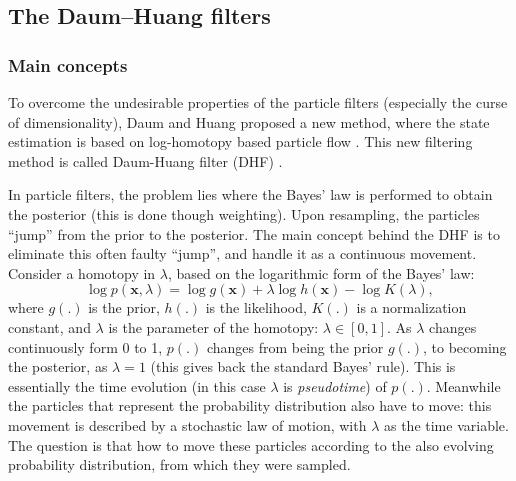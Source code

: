 \subsection{The Daum--Huang filters}
\subsubsection{Main concepts}
To overcome the  undesirable properties of the particle filters (especially the curse of dimensionality), Daum and Huang proposed a new method, where the state estimation is based on log-homotopy based particle flow \cite{Daum2007}. This new filtering method is called Daum-Huang filter (DHF) \cite{Choi2011}.

In particle filters, the problem lies where the Bayes' law is performed to obtain the posterior (this is done though weighting). Upon resampling, the particles ``jump'' from the prior to the posterior. The main concept behind the DHF is to eliminate this often faulty ``jump'', and handle it as a continuous movement. Consider a homotopy in $\lambda$, based on the logarithmic form of the Bayes' law:
\begin{equation}\label{eq:bayes-loghom}
    \log p(\mathbf{x},\lambda) = \log g(\mathbf{x}) + \lambda \log h(\mathbf{x}) - \log K(\lambda),
\end{equation}
where $g(.)$ is the prior, $h(.)$ is the likelihood, $K(.)$ is a normalization constant, and $\lambda$ is the parameter of the homotopy: $\lambda \in [0,1]$. As $\lambda$ changes continuously form 0 to 1, $p(.)$ changes from being the prior $g(.)$, to becoming the posterior, as $\lambda = 1$ (this gives back the standard Bayes' rule). This is essentially the time evolution (in this case $\lambda$ is \emph{pseudotime}) of $p(.)$. Meanwhile the particles that represent the probability distribution also have to move: this movement is described by a stochastic law of motion, with $\lambda$ as the time variable. The question is that how to move these particles according to the also evolving probability distribution, from which they were sampled.

